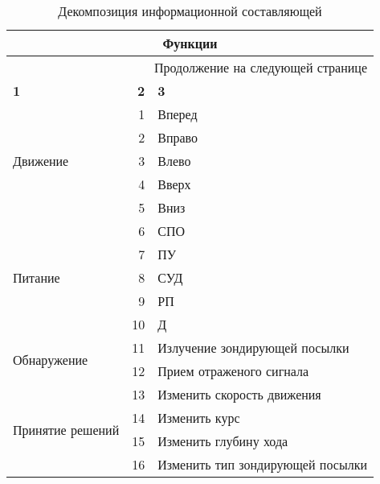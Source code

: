\begin{longtable}{|l|r|m{}|}
  \caption{Декомпозиция информационной составляющей}\label{tbl:model_anpa_informations}\\
  \toprule
  \multicolumn{3}{|c|}{\textbf{Функции}} \\
  \midrule
  \endhead
  \midrule
  \multicolumn{3}{r}{Продолжение на следующей странице} \\
  \midrule
  \endfoot
  \bottomrule
  \endlastfoot
  \textbf{1} & \textbf{2} & \textbf{3} \\\hline
  \multirow{5}{.25\textwidth}{Движение} & 1 & Вперед \\\cline{2-3}
                                        & 2 & Вправо \\\cline{2-3}
                                        & 3 & Влево \\\cline{2-3}
                                        & 4 & Вверх \\\cline{2-3}
                                        & 5 & Вниз \\\hline
  \multirow{5}{.25\textwidth}{Питание}  & 6  & СПО \\\cline{2-3}
                                        & 7  & ПУ \\\cline{2-3}
                                        & 8  & СУД \\\cline{2-3}
                                        & 9  & РП \\\cline{2-3}
                                        & 10 & Д \\\hline
  \multirow{2}{.25\textwidth}{Обнаружение} & 11 & Излучение зондирующей посылки \\\cline{2-3}
                                           & 12 & Прием отраженого сигнала \\\hline
  \multirow{4}{.25\textwidth}{Принятие решений} & 13 & Изменить скорость движения \\\cline{2-3}
                                                & 14 & Изменить курс \\\cline{2-3}
                                                & 15 & Изменить глубину хода \\\cline{2-3}
                                                & 16 & Изменить тип зондирующей посылки \\
\end{longtable}
    
